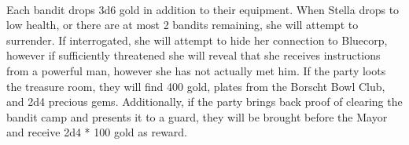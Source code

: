 \\
Each bandit drops 3d6 gold in addition to their equipment. When Stella drops to low health, or there are at most 2 bandits remaining, she will attempt to surrender. If interrogated, she will attempt to hide her connection to Bluecorp, however if sufficiently threatened she will reveal that she receives instructions from a powerful man, however she has not actually met him. If the party loots the treasure room, they will find 400 gold, plates from the Borscht Bowl Club, and 2d4 precious gems. Additionally, if the party brings back proof of clearing the bandit camp and presents it to a guard, they will be brought before the Mayor and receive 2d4 * 100 gold as reward.